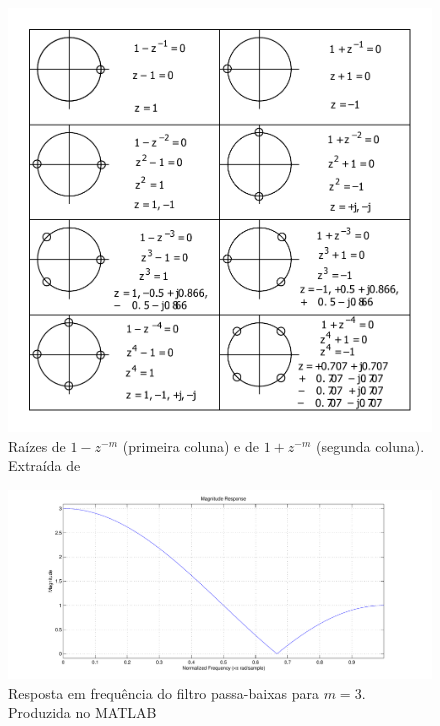 \begin{figure}[ht!]
    \centering
    \includegraphics[width=400pt]{figures/chap3-zeros.pdf}
    \caption[Raízes de $1-z^{-m}$ e de $1+z^{-m}$]{Raízes de $1-z^{-m}$ (primeira coluna) e de $1+z^{-m}$ (segunda coluna). Extraída de \cite{Tompkins1993}}
    \label{fig:zeros}
\end{figure}

\begin{figure}[ht!]
    \centering
    \includegraphics[width=500pt]{figures/chap3-freqz-lp.pdf}
    \caption[Resposta em frequência do filtro passa-baixas para $m=3$]{Resposta em frequência do filtro passa-baixas para $m=3$. Produzida no MATLAB}
    \label{fig:freqzlp}
\end{figure}


